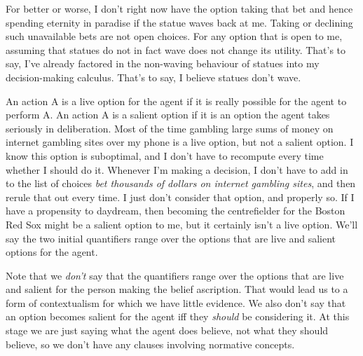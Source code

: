 \documentclass[
  11pt,
  letterpaper,
  DIV=11,
  numbers=noendperiod,
  oneside]{scrartcl}
\begin{document}
For better or worse, I don't right now have the option taking that bet
and hence spending eternity in paradise if the statue waves back at me.
Taking or declining such unavailable bets are not open choices. For any
option that is open to me, assuming that statues do not in fact wave
does not change its utility. That's to say, I've already factored in the
non-waving behaviour of statues into my decision-making calculus. That's
to say, I believe statues don't wave.

An action A is a live option for the agent if it is really possible for
the agent to perform A. An action A is a salient option if it is an
option the agent takes seriously in deliberation. Most of the time
gambling large sums of money on internet gambling sites over my phone is
a live option, but not a salient option. I know this option is
suboptimal, and I don't have to recompute every time whether I should do
it. Whenever I'm making a decision, I don't have to add in to the list
of choices \emph{bet thousands of dollars on internet gambling sites},
and then rerule that out every time. I just don't consider that option,
and properly so. If I have a propensity to daydream, then becoming the
centrefielder for the Boston Red Sox might be a salient option to me,
but it certainly isn't a live option. We'll say the two initial
quantifiers range over the options that are live and salient options for
the agent.

Note that we \emph{don't} say that the quantifiers range over the
options that are live and salient for the person making the belief
ascription. That would lead us to a form of contextualism for which we
have little evidence. We also don't say that an option becomes salient
for the agent iff they \emph{should} be considering it. At this stage we
are just saying what the agent does believe, not what they should
believe, so we don't have any clauses involving normative concepts.
\end{document}
